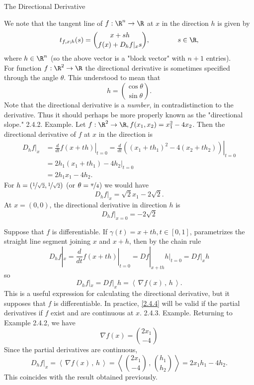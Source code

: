 \documentclass[smaller,hyperref={CJKbookmarks=true}]{beamer}
\newcommand{\scp}[2]{\left\langle\,#1\,,\,#2\,\right\rangle} \newcommand{\scpp}{\langle\,\cdot\,,\,\cdot\,\rangle}
\begin{document}
\begin{frame}{The Directional Derivative}
\begin{spacing}{1}
\begin{figure}
\end{figure}
\newpage
We note that the tangent line of $f:\R^n\to\R$ at $x$ in the direction $h$ is given by
\begin{equation}\label{2.4.3}
  t_{f,x;h}(s)=\binom{x+sh}{f(x)+D_hf|_xs},\qquad\qquad
  s\in\R,
\end{equation}
where $h\in\R^n$ (so the above vector is a "block vector" with $n+1$ entries).\\[5pt]
For function $f:\R^2\to\R$ the directional derivative is sometimes specified through the angle $\theta$. This understood to mean that
\[h=\binom{\cos\theta}{\sin\theta}.\]
Note that the directional derivative is a \emph{number}, in contradistinction to
the derivative. Thus it should perhaps be more properly known as the
"directional slope."
\newpage
\alert{2.4.2. Example.} Let $f:\R^2\to\R,f(x_1,x_2)=x_1^2-4x_2$. Then the directional derivative of $f$ at $x$ in the direction is
\begin{equation*}
  \begin{split}
     D_hf|_x &=\left.\frac{d}{dt}f(x+th)\right|_{t=0}
     =\left.\frac{d}{dt}\left((x_1+th_1)^2-4(x_2+th_2)\right)\right|_{t=0} \\
       &=2h_1(x_1+th_1)-4h_2|_{t=0}  \\
       &=2h_1x_1-4h_2.
  \end{split}
\end{equation*}
For $h=(\nicefrac{1}{\sqrt{2}},\nicefrac{1}{\sqrt{2}})$ (or $\theta=\nicefrac{\pi}{4}$) we would have
\[D_hf|_x=\sqrt{2}x_1-2\sqrt{2}.\]
At $x=(0,0)$, the directional derivative in direction $h$ is
\[D_hf|_{x=0}=-2\sqrt{2}\]
\end{spacing}
\newpage
\begin{spacing}{1.2}
Suppose that $f$ is dif{}ferentiable. If $\gamma(t)=x+th,t\in[0,1]$, parametrizes the straight line segment joining $x$ and $x+h$, then by the chain rule
\[D_hf|_x=\left.\frac{d}{dt}f(x+th)\right|_{t=0}
=Df|_{x+th}h\Big|_{t=0}=Df|_xh\]
so
\begin{equation}\label{2.4.4}
  D_hf|_x=Df|_xh=\scp{\nabla f(x)}{h}.
\end{equation}
This is a useful expression for calculating the directional derivative, but it
supposes that $f$ is dif{}ferentiable. In practice, \eqref{2.4.4} will be valid if the
partial derivatives if $f$ exist and are continuous at $x$.
\newpage
\alert{2.4.3. Example.} Returning to Example 2.4.2, we have
\[\nabla f(x)=\binom{2x_1}{-4}\]
Since the partial derivatives are continuous,
\[D_hf|_x=\scp{\nabla f(x)}{h}=\scp{\binom{2x_1}{-4}}{\binom{h_1}{h_2}}
=2x_1h_1-4h_2.\]
This coincides with the result obtained previously.
\end{spacing}
\end{frame}
\end{document}
